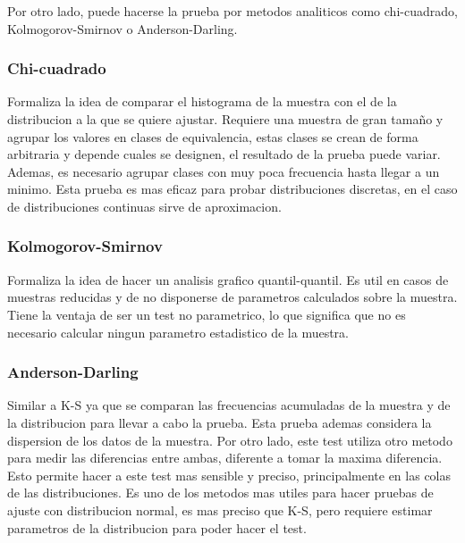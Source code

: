 \documentclass[a4paper]{article}
\begin{document}
Por otro lado, puede hacerse la prueba por metodos analiticos como chi-cuadrado, Kolmogorov-Smirnov o Anderson-Darling.
\subsubsection*{Chi-cuadrado}
Formaliza la idea de comparar el histograma de la muestra con el de la distribucion a la que se quiere ajustar.
Requiere una muestra de gran tamaño y agrupar los valores en clases de equivalencia, estas clases se crean de forma 
arbitraria y depende cuales se designen, el resultado de la prueba puede variar. Ademas, es necesario agrupar clases
con muy poca frecuencia hasta llegar a un minimo.
Esta prueba es mas eficaz para probar distribuciones discretas, en el caso de distribuciones continuas sirve de 
aproximacion.

\subsubsection*{Kolmogorov-Smirnov}
Formaliza la idea de hacer un analisis grafico quantil-quantil.
Es util en casos de muestras reducidas y de no disponerse de parametros calculados sobre la muestra.
Tiene la ventaja de ser un test no parametrico, lo que significa que no es necesario calcular ningun 
parametro estadistico de la muestra.


\subsubsection*{Anderson-Darling}
Similar a K-S ya que se comparan las frecuencias acumuladas de la muestra y de la distribucion para llevar a cabo
la prueba. Esta prueba ademas considera la dispersion de los datos de la muestra. Por otro lado, este test utiliza 
otro metodo para medir las diferencias entre ambas, diferente a tomar
la maxima diferencia. Esto permite hacer a este test mas sensible y preciso, principalmente en las colas de las 
distribuciones.
Es uno de los metodos mas utiles para hacer pruebas de ajuste con distribucion normal, es mas preciso que K-S, 
pero requiere estimar parametros de la distribucion para poder hacer el test.
\end{document}
